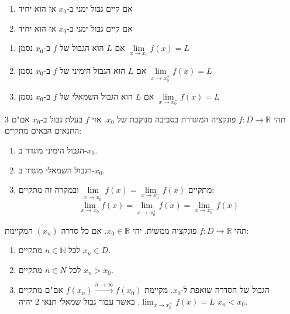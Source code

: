 \documentclass{tstextbook}
\begin{document}
\begin{proposition}
  \begin{enumerate}
    \item אם קיים גבול ימני ב-\(x_{0}\) אז הוא יחיד 


    \item אם קיים גבול ימני ב-\(x_{0}\) אז הוא יחיד 


  \end{enumerate}
\end{proposition}
\begin{symbolize}
  \begin{enumerate}
    \item אם \(L\) הוא הגבול של \(f\) ב-\(x_{0}\) נסמן \(\underset{ x \to x_{0} }{\lim }f(x)=L\)


    \item אם \(L\) הוא הגבול הימיני של \(f\) ב-\(x_{0}\) נסמן \(\underset{ x \to x_{0}^{+} }{\lim }f(x)=L\)


    \item אם \(L\) הוא הגבול השמאלי של \(f\) ב-\(x_{0}\) נסמן \(\underset{ x \to x_{0}^{-} }{\lim }f(x)=L\)


  \end{enumerate}
\end{symbolize}
\begin{proposition}
תהי \(f:D\to \mathbb{R}\) פונקציה המוגדרת בסביבה מנוקבת של \(x_{0}\). אזי \(f\) בעלת גבול ב-\(x_{0}\) אם"ם 3 התנאים הבאים מתקיים:

  \begin{enumerate}
    \item הגבול הימיני מוגדר ב-\(x_{0}\). 


    \item הגבול השמאלי מוגדר ב-\(x_{0}\). 


    \item מתקיים \(\underset{ x \to x_{0}^{+} }{\lim }f(x)=\underset{ x \to x_{0}^{-} }{\lim }f(x)\) 
ובמקרה זה מתקיים:
$$\lim_{ x \to x_{0} } f(x)=\lim_{ x \to x_{0}^{+} }f(x)=\lim_{ x \to x_{0}^{-} }  f(x)$$


  \end{enumerate}
\end{proposition}
\begin{theorem}
תהי \(f:D\to \mathbb{R}\) פונקציה ממשית. יהי \(x_{0} \in \mathbb{R}\). אם כל סדרה \((x_{n})\) המקיימת:

  \begin{enumerate}
    \item לכל \(n \in \mathbb{N}\) מתקיים \(x_{n}\in D\). 


    \item לכל \(n \in N\) מתקיים \(x_{n} > x_{0}\). 


    \item הגבול של הסדרה שואפת ל-\(x_{0}\). 
מקיימת \(f(x_{n})\xrightarrow{n\to \infty}f(x_{0})\) אם"ם מתקיים \(\lim_{ x \to x_{0}^{+} }f(x)=L\).
כאשר עבור גבול שמאלי תנאי 2 יהיה \(x_{n}<x_{0}\).


  \end{enumerate}
\end{theorem}
\end{document}
